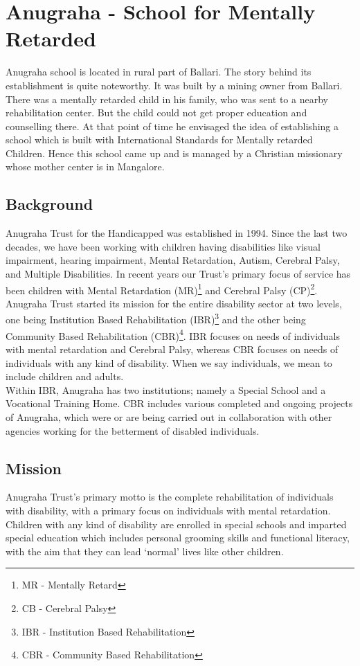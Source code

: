 \chapter{Anugraha - School for Mentally Retarded}
Anugraha school is located in rural part of Ballari. The story behind its establishment is quite noteworthy. It was built by a mining owner from Ballari. There was a mentally retarded child in his family, who was sent to a nearby rehabilitation center. But the child could not get proper education and counselling there. At that point of time he envisaged the idea of establishing a school which is built with International Standards for Mentally retarded Children. Hence this school came up and is managed by a Christian missionary whose mother center is in Mangalore. 

\section{Background}
Anugraha Trust for the Handicapped was established in 1994. Since the last two decades, we have been working with children having disabilities like visual impairment, hearing impairment, Mental Retardation, Autism, Cerebral Palsy, and Multiple Disabilities. In recent years our Trust’s primary focus of service has been children with Mental Retardation (MR)\footnote{MR - Mentally Retard} and Cerebral Palsy (CP)\footnote{CB - Cerebral Palsy}.\\

Anugraha Trust started its mission for the entire disability sector at two levels, one being Institution Based Rehabilitation (IBR)\footnote{IBR - Institution Based Rehabilitation} and the other being Community Based Rehabilitation (CBR)\footnote{CBR - Community Based Rehabilitation}. IBR focuses on needs of individuals with mental retardation and Cerebral Palsy, whereas CBR focuses on needs of individuals with any kind of disability. When we say individuals, we mean to include children and adults.\\

Within IBR, Anugraha has two institutions; namely a Special School and a Vocational Training Home. CBR includes various completed and ongoing projects of Anugraha, which were or are being carried out in collaboration with other agencies working for the betterment of disabled individuals.

\section{Mission}
Anugraha Trust’s primary motto is the complete rehabilitation of individuals with disability, with a primary focus on individuals with mental retardation. Children with any kind of disability are enrolled in special schools and imparted special education which includes personal grooming skills and functional literacy, with the aim that they can lead ‘normal’ lives like other children.\\

